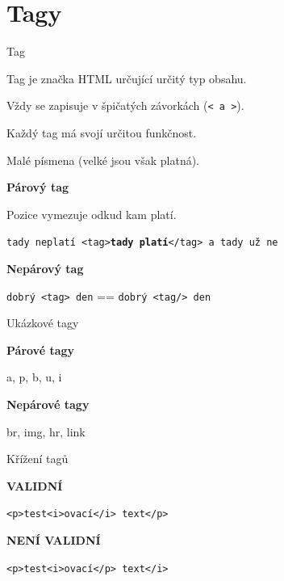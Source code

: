 \documentclass[aspectratio=1610]{beamer}
\begin{document}
\section{Tagy}
\begin{frame}{Tag}
    \begin{cardTiny}
        Tag je značka HTML určující určitý typ obsahu.

        Vždy se zapisuje v špičatých závorkách (\texttt{< a >}).

        Každý tag má svojí určitou funkčnost.

        Malé písmena (velké jsou však platná).
    \end{cardTiny}
    \begin{cardTiny}
        \begin{center}
        \textbf{Párový tag}

        Pozice vymezuje odkud kam platí.

        \texttt{tady neplatí <tag>\textbf{tady platí}</tag> a tady už ne}
        \end{center}
    \end{cardTiny}
    \begin{cardTiny}
        \begin{center}
        \textbf{Nepárový tag}

        \texttt{dobrý <tag> den} == \texttt{dobrý <tag/> den}
        \end{center}
    \end{cardTiny}
\end{frame}

\begin{frame}{Ukázkové tagy}
    \begin{cardTiny}
        \begin{center}
        \textbf{Párové tagy}

        a, p, b, u, i
        \end{center}
    \end{cardTiny}
    \begin{cardTiny}
        \begin{center}
        \textbf{Nepárové tagy}

        br, img, hr, link
        \end{center}
    \end{cardTiny}
\end{frame}

\begin{frame}{Křížení tagů}
    \begin{cardTiny}
        \begin{center}
        \textbf{VALIDNÍ}

        \texttt{<p>test<i>ovací</i> text</p>}
        \end{center}
    \end{cardTiny}
    \begin{cardTiny}
        \begin{center}
        \textbf{NENÍ VALIDNÍ}

        \texttt{<p>test<i>ovací</p> text</i>}
        \end{center}
    \end{cardTiny}
\end{frame}
\end{document}
